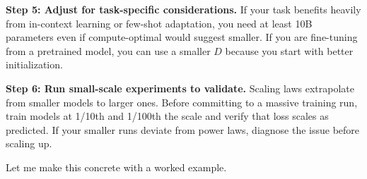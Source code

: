 \textbf{Step 5: Adjust for task-specific considerations.} If your task benefits heavily from in-context learning or few-shot adaptation, you need at least 10B parameters even if compute-optimal would suggest smaller. If you are fine-tuning from a pretrained model, you can use a smaller $D$ because you start with better initialization.

\textbf{Step 6: Run small-scale experiments to validate.} Scaling laws extrapolate from smaller models to larger ones. Before committing to a massive training run, train models at 1/10th and 1/100th the scale and verify that loss scales as predicted. If your smaller runs deviate from power laws, diagnose the issue before scaling up.

Let me make this concrete with a worked example.

\vspace{1.5em}

